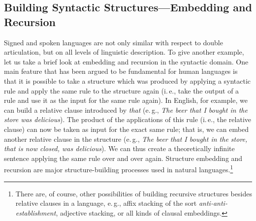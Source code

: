 \subsection{Building Syntactic Structures---Embedding and Recursion}
Signed and spoken languages are not only similar with respect to double articulation, but on all levels of linguistic description. To give another example, let us take a brief look at embedding and recursion in the syntactic domain. One main feature that has been argued to be fundamental for human languages is that it is possible to take a structure which was produced by applying a syntactic rule and apply the same rule to the structure again (i.\,e., take the output of a rule and use it as the input for the same rule again). In English, for example, we can build a relative clause introduced by \textit{that} (e.\,g., \textit{The beer that I bought in the store was delicious}). The product of the applications of this rule (i.\,e., the relative clause) can now be taken as input for the exact same rule; that is, we can embed another relative clause in the structure (e.\,g., \textit{The beer that I bought in the store, that is now closed, was delicious}). We can thus create a theoretically infinite sentence applying the same rule over and over again. Structure embedding and recursion are major structure-building processes used in natural languages.\footnote{ There are, of course, other possibilities of building recursive structures besides relative clauses in a language, e.\,g., affix stacking of the sort \textit{anti-anti-establishment}, adjective stacking, or all kinds of clausal embeddings.} 

